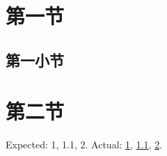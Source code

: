 \documentclass[UTF8,fontset=fandol,scheme=plain]{ctexart}
\begin{document}
\section{第一节}\label{sec:first}
\subsection{第一小节}\label{sec:sub}
\section{第二节}\label{sec:second}
Expected: 1, 1.1, 2. Actual: \ref{sec:first}, \ref{sec:sub}, \ref{sec:second}.
\end{document}
